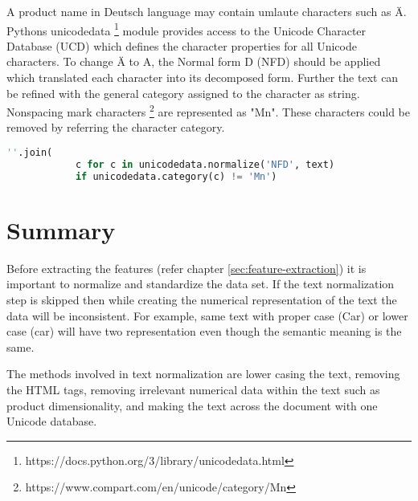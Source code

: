 A product name in Deutsch language may contain umlaute characters such as \"A.  Pythons unicodedata \footnote{https://docs.python.org/3/library/unicodedata.html} module provides access to the Unicode Character Database (UCD) which defines the character properties for all Unicode characters. To change \"A to A, the Normal form D (NFD) should be applied which translated each character into its decomposed form. Further the text can be refined with the general category assigned to the character as string. Nonspacing mark characters \footnote{https://www.compart.com/en/unicode/category/Mn} are represented as "Mn". These characters could be removed by referring the character category.
\begin{lstlisting}[language=Python ,caption={NFD normalization}]
      ''.join(
            c for c in unicodedata.normalize('NFD', text)
            if unicodedata.category(c) != 'Mn')
\end{lstlisting}


\section{Summary}

Before extracting the features (refer chapter \ref{sec:feature-extraction}) it is important to normalize and standardize the data set. If the text normalization step is skipped then while creating the numerical representation of the text the data will be inconsistent. For example, same text with proper case (Car) or lower case (car) will have two representation even though the semantic meaning is the same.  

The methods involved in text normalization are lower casing the text, removing the HTML tags, removing irrelevant numerical data within the text such as product dimensionality, and making the text across the document with one Unicode database.
